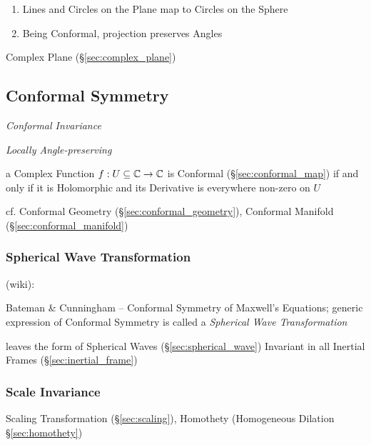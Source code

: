 \begin{enumerate}
  \item Lines and Circles on the Plane map to Circles on the Sphere
  \item Being Conformal, projection preserves Angles
\end{enumerate}

Complex Plane (\S\ref{sec:complex_plane})



\subsection{Conformal Symmetry}\label{sec:conformal_symmetry}

\emph{Conformal Invariance}

\emph{Locally Angle-preserving}

a Complex Function $f : U \subseteq \mathbb{C} \to \mathbb{C}$ is Conformal
(\S\ref{sec:conformal_map}) if and only if it is Holomorphic and its Derivative
is everywhere non-zero on $U$

cf. Conformal Geometry (\S\ref{sec:conformal_geometry}),
Conformal Manifold (\S\ref{sec:conformal_manifold})



\subsubsection{Spherical Wave Transformation}
\label{sec:spherical_wave_transformation}

(wiki):

Bateman \& Cunningham -- Conformal Symmetry of Maxwell's Equations; generic
expression of Conformal Symmetry is called a \emph{Spherical Wave
  Transformation}

leaves the form of Spherical Waves (\S\ref{sec:spherical_wave}) Invariant in
all Inertial Frames (\S\ref{sec:inertial_frame})



\subsubsection{Scale Invariance}\label{sec:scale_invariance}

Scaling Transformation (\S\ref{sec:scaling}), Homothety (Homogeneous Dilation
\S\ref{sec:homothety})

